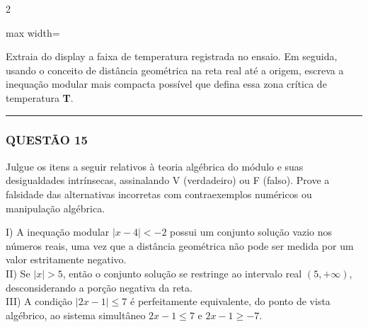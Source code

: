\documentclass[twoside, 10pt, a4paper]{article}
\begin{document}
\begin{multicols*}{2}
\begin{center}
\begin{adjustbox}{max width=\linewidth}
\end{adjustbox}
\end{center}

Extraia do display a faixa de temperatura registrada no ensaio. Em seguida, usando o conceito de distância geométrica na reta real até a origem, escreva a inequação modular mais compacta possível que defina essa zona crítica de temperatura \textbf{T}.

\vspace{0cm} \noindent\textcolor{CorLinha}{\rule{\linewidth}{0.5pt}} \vspace{-0.2cm}
\subsubsection*{QUESTÃO 15}
Julgue os itens a seguir relativos à teoria algébrica do módulo e suas desigualdades intrínsecas, assinalando V (verdadeiro) ou F (falso). Prove a falsidade das alternativas incorretas com contraexemplos numéricos ou manipulação algébrica.

I) A inequação modular $ |x - 4| < -2 $ possui um conjunto solução vazio nos números reais, uma vez que a distância geométrica não pode ser medida por um valor estritamente negativo.\\[0.3cm]
II) Se $ |x| > 5 $, então o conjunto solução se restringe ao intervalo real $ (5, +\infty) $, desconsiderando a porção negativa da reta.\\[0.3cm]
III) A condição $ |2x - 1| \le 7 $ é perfeitamente equivalente, do ponto de vista algébrico, ao sistema simultâneo $ 2x - 1 \le 7 $ e $ 2x - 1 \ge -7 $.


\end{multicols*}
\end{document}
